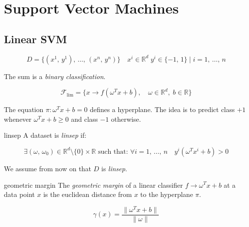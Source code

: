 \section{Support Vector Machines}

\subsection{Linear SVM}
\label{sec:linear-svm}

\begin{equation*}
	D = \{ (x^1,\, y^1),\, \dots,\, (x^n,\, y^n) \} \quad  x^i \in \mathds{R}^d \; y^i \in \{-1,\, 1\} \mid i = 1,\, \dots,\, n
\end{equation*}

The sum is a \emph{binary classification}.

\begin{equation}
	\mathcal{F}_{\text{lim}} = \{x \to f\left(\omega^Tx + b\right),\quad \omega \in \mathds{R}^d, \; b \in \mathds{R} \}
\end{equation}

The equation $\pi : \omega^Tx + b = 0$ defines a hyperplane.
The idea is to predict class $+1$ whenever $\omega^Tx + b \geq 0$ and class $-1$ otherwise.

\begin{definition}{linsep}{}
	A dataset is \emph{linsep} if:

	\begin{equation*}
		\exists (\omega,\, \omega_0) \in \mathds{R}^d \setminus \{0\} \times \mathds{R}
		\text{ such that: }
		\forall i=1,\,\dots,\,n\quad y^i(\omega^Tx^i +b) > 0
	\end{equation*}
\end{definition}

We assume from now on that $D$ is \emph{linsep}.

\begin{definition}{geometric margin}{}
	The \emph{geometric margin} of a linear
	classifier $f \to \omega^Tx + b$ at a data point $x$ is the
	euclidean distance from $x$ to the hyperplane $\pi$.

	\begin{equation*}
		\gamma(x) = \frac{\|\omega^Tx + b\|}{\lVert\omega\rVert} \tag{geometric margin}
	\end{equation*}
\end{definition}

